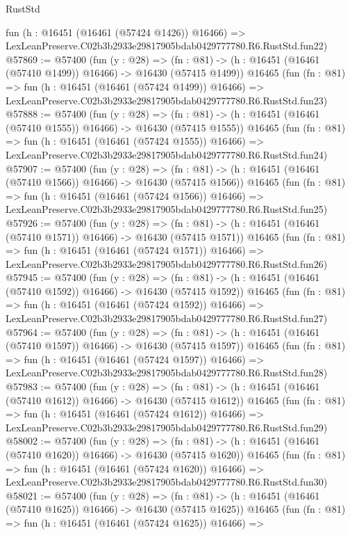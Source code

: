 \begin{lexlean}{RustStd}
\begin{coremodule}
    fun (h : @16451 (@16461 (@57424 @1426)) @16466) =>
    LexLeanPreserve.C02b3b2933e29817905bdab0429777780.R6.RustStd.fun22)
@57869 := @57400
    (fun (y : @28) =>
    (fn : @81) -> (h : @16451 (@16461 (@57410 @1499)) @16466) -> @16430 (@57415 @1499))
    @16465
    (fun (fn : @81) =>
    fun (h : @16451 (@16461 (@57424 @1499)) @16466) =>
    LexLeanPreserve.C02b3b2933e29817905bdab0429777780.R6.RustStd.fun23)
@57888 := @57400
    (fun (y : @28) =>
    (fn : @81) -> (h : @16451 (@16461 (@57410 @1555)) @16466) -> @16430 (@57415 @1555))
    @16465
    (fun (fn : @81) =>
    fun (h : @16451 (@16461 (@57424 @1555)) @16466) =>
    LexLeanPreserve.C02b3b2933e29817905bdab0429777780.R6.RustStd.fun24)
@57907 := @57400
    (fun (y : @28) =>
    (fn : @81) -> (h : @16451 (@16461 (@57410 @1566)) @16466) -> @16430 (@57415 @1566))
    @16465
    (fun (fn : @81) =>
    fun (h : @16451 (@16461 (@57424 @1566)) @16466) =>
    LexLeanPreserve.C02b3b2933e29817905bdab0429777780.R6.RustStd.fun25)
@57926 := @57400
    (fun (y : @28) =>
    (fn : @81) -> (h : @16451 (@16461 (@57410 @1571)) @16466) -> @16430 (@57415 @1571))
    @16465
    (fun (fn : @81) =>
    fun (h : @16451 (@16461 (@57424 @1571)) @16466) =>
    LexLeanPreserve.C02b3b2933e29817905bdab0429777780.R6.RustStd.fun26)
@57945 := @57400
    (fun (y : @28) =>
    (fn : @81) -> (h : @16451 (@16461 (@57410 @1592)) @16466) -> @16430 (@57415 @1592))
    @16465
    (fun (fn : @81) =>
    fun (h : @16451 (@16461 (@57424 @1592)) @16466) =>
    LexLeanPreserve.C02b3b2933e29817905bdab0429777780.R6.RustStd.fun27)
@57964 := @57400
    (fun (y : @28) =>
    (fn : @81) -> (h : @16451 (@16461 (@57410 @1597)) @16466) -> @16430 (@57415 @1597))
    @16465
    (fun (fn : @81) =>
    fun (h : @16451 (@16461 (@57424 @1597)) @16466) =>
    LexLeanPreserve.C02b3b2933e29817905bdab0429777780.R6.RustStd.fun28)
@57983 := @57400
    (fun (y : @28) =>
    (fn : @81) -> (h : @16451 (@16461 (@57410 @1612)) @16466) -> @16430 (@57415 @1612))
    @16465
    (fun (fn : @81) =>
    fun (h : @16451 (@16461 (@57424 @1612)) @16466) =>
    LexLeanPreserve.C02b3b2933e29817905bdab0429777780.R6.RustStd.fun29)
@58002 := @57400
    (fun (y : @28) =>
    (fn : @81) -> (h : @16451 (@16461 (@57410 @1620)) @16466) -> @16430 (@57415 @1620))
    @16465
    (fun (fn : @81) =>
    fun (h : @16451 (@16461 (@57424 @1620)) @16466) =>
    LexLeanPreserve.C02b3b2933e29817905bdab0429777780.R6.RustStd.fun30)
@58021 := @57400
    (fun (y : @28) =>
    (fn : @81) -> (h : @16451 (@16461 (@57410 @1625)) @16466) -> @16430 (@57415 @1625))
    @16465
    (fun (fn : @81) =>
    fun (h : @16451 (@16461 (@57424 @1625)) @16466) =>

\end{coremodule}
\end{lexlean}
